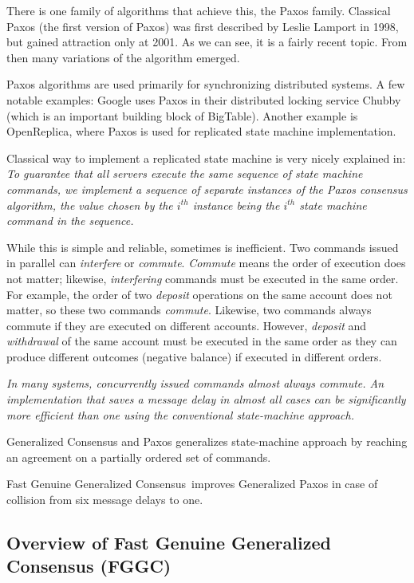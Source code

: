 \documentclass[english,11pt]{article}
\newcommand{\fggc}{Fast Genuine Generalized Consensus}
\begin{document}
There is one family of algorithms that achieve this, the Paxos family.
Classical Paxos (the first version of Paxos) was first described by Leslie
Lamport in 1998\cite{classic-paxos}, but gained attraction only at
2001\cite{paxos-simple}. As we can see, it is a fairly recent topic. From then
many variations of the algorithm emerged.

Paxos algorithms are used primarily for synchronizing distributed systems. A few
notable examples: Google uses Paxos in their distributed locking service
Chubby\cite{chubby} (which is an important building block of BigTable). Another
example is OpenReplica\cite{openreplica}, where Paxos is used for replicated
state machine implementation.

Classical way to implement a replicated state machine is very nicely explained
in\cite{paxos-simple}: \emph{To guarantee that all servers execute the same
    sequence of state machine commands, we implement a sequence of separate
    instances of the Paxos consensus algorithm, the value chosen by the $i^{th}$
instance being the $i^{th}$ state machine command in the sequence.}

While this is simple and reliable, sometimes is inefficient. Two commands issued
in parallel can \emph{interfere} or \emph{commute}. \emph{Commute} means the
order of execution does not matter; likewise, \emph{interfering} commands must
be executed in the same order. For example, the order of two \emph{deposit}
operations on the same account does not matter, so these two commands
\emph{commute}. Likewise, two commands always commute if they are executed on
different accounts. However, \emph{deposit} and \emph{withdrawal} of the same
account must be executed in the same order as they can produce different
outcomes (negative balance) if executed in different orders.

\emph{In many systems, concurrently issued commands almost always commute. An
    implementation that saves a message delay in almost all cases can be
    significantly more efficient than one using the conventional state-machine
approach.}

Generalized Consensus and Paxos generalizes state-machine approach by reaching
an agreement on a partially ordered set of commands.

\fggc\ improves Generalized Paxos in case of collision from six message delays
to one.

\subsection{Overview of Fast Genuine Generalized Consensus (FGGC)}
\end{document}
